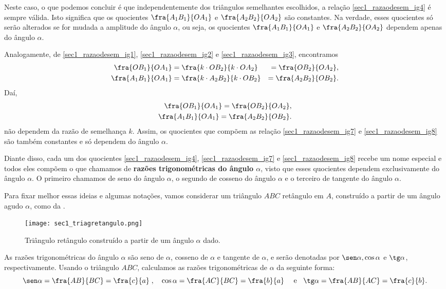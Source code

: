 Neste caso, o que podemos concluir é que independentemente dos triângulos semelhantes escolhidos, a relação \eqref{sec1_razaodesem_ig4} é sempre válida. Isto significa que os quocientes $\fra{A_1B_1}{OA_1}$ e $\fra{A_2B_2}{OA_2}$ são constantes. Na verdade, esses quocientes só serão alterados se for mudada a amplitude do ângulo $\alpha$, ou seja, os quocientes $\fra{A_1B_1}{OA_1}$ e $\fra{A_2B_2}{OA_2}$ dependem apenas do ângulo $\alpha$.

Analogamente, de \eqref{sec1_razaodesem_ig1}, \eqref{sec1_razaodesem_ig2} e \eqref{sec1_razaodesem_ig3}, encontramos
\begin{eqnarray}
\fra{OB_1}{OA_1} & = \fra{k\cdot OB_2}{k \cdot OA_2} & =  \fra{OB_2}{OA_2}, \nonumber\\ 
\fra{A_1B_1}{OA_1} & =\fra{k\cdot A_2B_2}{k \cdot OB_2} & =  \fra{A_2B_2}{OB_2}. \nonumber 
\end{eqnarray}
Daí,
\begin{eqnarray}
\fra{OB_1}{OA_1} = \fra{OB_2}{OA_2}, \label{sec1_razaodesem_ig7}\\ 
\fra{A_1B_1}{OA_1} = \fra{A_2B_2}{OB_2}.  \label{sec1_razaodesem_ig8} 
\end{eqnarray}
não dependem da razão de semelhança $k$. Assim, os quocientes que compõem as relação \eqref{sec1_razaodesem_ig7} e \eqref{sec1_razaodesem_ig8} são também constantes e só dependem do ângulo $\alpha$.
    
Diante disso, cada um dos quocientes \eqref{sec1_razaodesem_ig4}, \eqref{sec1_razaodesem_ig7} e \eqref{sec1_razaodesem_ig8} recebe um nome especial e todos eles compõem o que chamamos de {\textbf{razões trigonométricas  do ângulo $\alpha$}}, visto que esses quocientes dependem exclusivamente do ângulo $\alpha$. O primeiro chamamos de seno do ângulo $\alpha$, o segundo de cosseno do ângulo $\alpha$ e o terceiro de tangente do ângulo $\alpha$. 
    
Para fixar melhor essas ideias e algumas notações, vamos considerar um triângulo  $ABC$ retângulo em $A$, construído a partir de um ângulo agudo $\alpha$, como da .     
\begin{figure}[H]
\centering
\texttt{[image: sec1\_triagretangulo.png]}
\caption{Triângulo retângulo construído a partir de um ângulo $\alpha$ dado.}
\label{TriagRet6}
\end{figure}

As razões trigonométricas do ângulo $\alpha$ são seno de $\alpha$, cosseno de $\alpha$ e tangente de $\alpha$, e serão denotadas por $\sen\alpha, \cos \alpha$ e $\tg\alpha$, respectivamente. Usando o triângulo $ABC$, calculamos as razões trigonométricas de $\alpha$ da seguinte forma:
$$\sen\alpha=\fra{AB}{BC}=\fra{c}{a}\;,\quad\cos\alpha=\fra{AC}{BC}=\fra{b}{a} \quad\text{ e }\;\; \tg\alpha=\fra{AB}{AC}=\fra{c}{b}.$$


